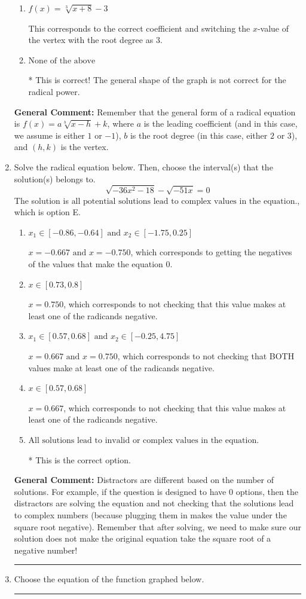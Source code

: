 \documentclass{extbook}[14pt]
\newcommand{\litem}[1]{\item #1

\rule{\textwidth}{0.4pt}}
\begin{document}
\begin{enumerate}
{\begin{enumerate}[label=\Alph*.]
This would be the correct option if the root degree was $2$.
\item \( f(x) = \sqrt[3]{x + 8} - 3 \)

This corresponds to the correct coefficient and switching the $x$-value of the vertex with the root degree as $3$.
\item \( \text{None of the above} \)

* This is correct! The general shape of the graph is not correct for the radical power.
\end{enumerate}

\textbf{General Comment:} Remember that the general form of a radical equation is $ f(x) = a \sqrt[b]{x - h} + k$, where $a$ is the leading coefficient (and in this case, we assume is either $1$ or $-1$), $b$ is the root degree (in this case, either $2$ or $3$), and $(h, k)$ is the vertex.
}
\litem{
Solve the radical equation below. Then, choose the interval(s) that the solution(s) belongs to.
\[ \sqrt{-36 x^2 - 18} - \sqrt{-51 x} = 0 \]The solution is \( \text{all potential solutions lead to complex values in the equation.} \), which is option E.\begin{enumerate}[label=\Alph*.]
\item \( x_1 \in [-0.86, -0.64] \text{ and } x_2 \in [-1.75,0.25] \)

$x = -0.667 \text{ and } x = -0.750$, which corresponds to getting the negatives of the values that make the equation 0.
\item \( x \in [0.73,0.8] \)

$x = 0.750$, which corresponds to not checking that this value makes at least one of the radicands negative.
\item \( x_1 \in [0.57, 0.68] \text{ and } x_2 \in [-0.25,4.75] \)

$x = 0.667 \text{ and } x = 0.750$, which corresponds to not checking that BOTH values make at least one of the radicands negative.
\item \( x \in [0.57,0.68] \)

$x = 0.667$, which corresponds to not checking that this value makes at least one of the radicands negative.
\item \( \text{All solutions lead to invalid or complex values in the equation.} \)

* This is the correct option.
\end{enumerate}

\textbf{General Comment:} Distractors are different based on the number of solutions. For example, if the question is designed to have 0 options, then the distractors are solving the equation and not checking that the solutions lead to complex numbers (because plugging them in makes the value under the square root negative). Remember that after solving, we need to make sure our solution does not make the original equation take the square root of a negative number!
}
\litem{
Choose the equation of the function graphed below.

}
\end{enumerate}
\end{document}
